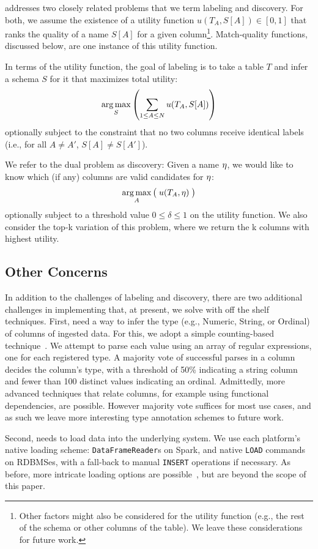 \systemname addresses two closely related problems that we term labeling and discovery.
For both, we assume the existence of a utility function $u(T_A, S[A]) \in [0, 1]$ that ranks the quality of a name $S[A]$ for a given column\footnote{Other factors might also be considered for the utility function (e.g., the rest of the schema or other columns of the table).  We leave these considerations for future work.}.  
Match-quality functions, discussed below, are one instance of this utility function.

In terms of the utility function, the goal of labeling is to take a table $T$ and infer a schema $S$ for it that maximizes total utility:
$$\operatorname*{arg\,max}_{S}\left(\sum_{1 \leq A \leq N}u(T_A, S[A])\right)$$ 
optionally subject to the constraint that no two columns receive identical labels (i.e., for all $A \neq A'$, $S[A] \neq S[A']$).

We refer to the dual problem as discovery: Given a name $\eta$, we would like to know which (if any) columns are valid candidates for $\eta$:
$$\operatorname*{arg\,max}_{A}\big(\; u(T_A, \eta)\;\big)$$
optionally subject to a threshold value $0 \leq \delta \leq 1$ on the utility function.  We also consider the top-k variation of this problem, where we return the k columns with highest utility.

\subsection{Other Concerns}
In addition to the challenges of labeling and discovery, there are two additional challenges in implementing \systemname that, at present, we solve with off the shelf techniques.
First, \systemname need a way to infer the type (e.g., Numeric, String, or Ordinal) of columns of ingested data.  
For this, we adopt a simple counting-based technique~\cite{yang2015lenses}.
We attempt to parse each value using an array of regular expressions, one for each registered type.
A majority vote of successful parses in a column decides the column's type, with a threshold of 50\% indicating a string column and fewer than 100 distinct values indicating an ordinal.
Admittedly, more advanced techniques that relate columns, for example using functional dependencies, are possible.
However majority vote suffices for most use cases, and as such we leave more interesting type annotation schemes to future work.

Second, \systemname needs to load data into the underlying system.  
We use each platform's native loading scheme: \texttt{DataFrameReader}s on Spark, and native \texttt{LOAD} commands on RDBMSes, with a fall-back to manual \texttt{INSERT} operations if necessary.
As before, more intricate loading options are possible~\cite{DBLP:conf/sigmod/AlagiannisBBIA12,DBLP:conf/cidr/IdreosKM07}, but are beyond the scope of this paper.






